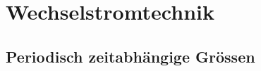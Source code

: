 \newcommand{\titleinfo}{Wechsel- \& Drehstromtechnik - Formelsammlung}
\newcommand{\authorinfo}{Braun \& Co, J.Rast}
\newcommand{\versioninfo}{$Revision: 1 $ - powered by \LaTeX}

%




\section{Wechselstromtechnik}
	\subsection{Periodisch zeitabhängige Grössen}
